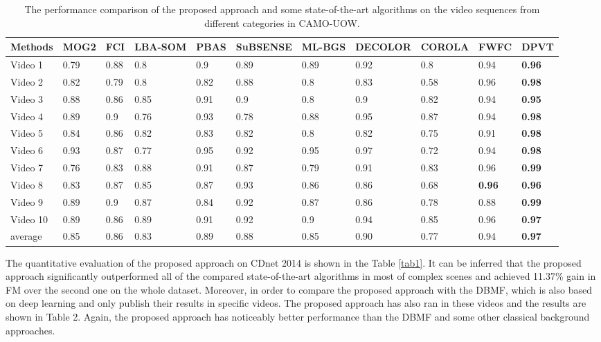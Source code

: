 \documentclass[journal]{IEEEtran}
\newcommand{\reftab}[1]{Table \ref{#1}}
\begin{document}
    
    \begin{table}[!t]
\centering
\caption{The performance comparison of the proposed approach and some state-of-the-art algorithms on the video sequences from different categories in CAMO-UOW.}
\label{tab3}
\begin{tabular}{lllllllllll}
\hline
Methods  & MOG2\cite{ZIVKOVIC2006773} & FCI\cite{Baf2008FCI}  & LBA-SOM\cite{LBA-SOM2008} & PBAS & SuBSENSE & ML-BGS\cite{ML-BGS2007} & DECOLOR\cite{DECOLOR2013}       & COROLA\cite{SHAKERI201628} & FWFC\cite{Li2018CAMO}          & DPVT          \\ \hline
Video 1  & 0.79 & 0.88 & 0.8     & 0.9  & 0.89     & 0.89   & 0.92          & 0.8    & 0.94 & \textbf{0.96} \\
Video 2  & 0.82 & 0.79 & 0.8     & 0.82 & 0.88     & 0.8    & 0.83          & 0.58   & 0.96          & \textbf{0.98} \\
Video 3  & 0.88 & 0.86 & 0.85    & 0.91 & 0.9      & 0.8    & 0.9           & 0.82   & 0.94 & \textbf{0.95} \\
Video 4  & 0.89 & 0.9  & 0.76    & 0.93 & 0.78     & 0.88   & 0.95          & 0.87   & 0.94          & \textbf{0.98} \\
Video 5  & 0.84 & 0.86 & 0.82    & 0.83 & 0.82     & 0.8    & 0.82          & 0.75   & 0.91          & \textbf{0.98} \\
Video 6  & 0.93 & 0.87 & 0.77    & 0.95 & 0.92     & 0.95   & 0.97	      & 0.72   & 0.94          & \textbf{0.98}  \\
Video 7  & 0.76 & 0.83 & 0.88    & 0.91 & 0.87     & 0.79   & 0.91          & 0.83   & 0.96          & \textbf{0.99} \\
Video 8  & 0.83 & 0.87 & 0.85    & 0.87 & 0.93     & 0.86   & 0.86          & 0.68   & \textbf{0.96}          & \textbf{0.96} \\
Video 9  & 0.89 & 0.9  & 0.87    & 0.84 & 0.92     & 0.87   & 0.86          & 0.78   & 0.88          & \textbf{0.99} \\
Video 10 & 0.89 & 0.86 & 0.89    & 0.91 & 0.92     & 0.9    & 0.94          & 0.85   & 0.96          & \textbf{0.97} \\ \hline
average  & 0.85 & 0.86 & 0.83    & 0.89 & 0.88     & 0.85   & 0.90          & 0.77   & 0.94          & \textbf{0.97} \\ \hline
\end{tabular}
\end{table}




The quantitative evaluation of the proposed approach on CDnet 2014 is shown in the \reftab{tab1}. 
It can be inferred that the proposed approach significantly outperformed all of the compared state-of-the-art algorithms in most of complex scenes and achieved 11.37\% gain in FM over the second one on the whole dataset. 
Moreover, in order to compare the proposed approach with the DBMF, which is also based on deep learning and only publish their results in  specific videos. 
The proposed approach has also ran in these videos and the results are shown in Table 2. 
Again, the proposed approach has noticeably better performance than the DBMF and some other classical background approaches.
\end{document}
